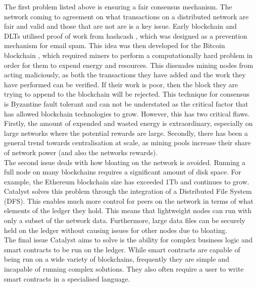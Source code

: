 The first problem listed above is ensuring a fair consensus mechanism. %
The network coming to agreement on what transactions on a distributed network are fair and valid and those that are not are is a key issue. Early blockchain and DLTs utilised proof of work from hashcash \cite{back2002hashcash}, which was designed as a prevention mechanism for email spam. This idea was then developed for the Bitcoin blockchain \cite{nakamoto2008bitcoin}, which required miners to perform a computationally hard problem in order for them to expend energy and  resources. This dissuades mining nodes from acting maliciously, as both the transactions they have added and the work they have performed can be verified. If their work is poor, then the block they are trying to append to the blockchain will be rejected. This technique for consensus is Byzantine fault tolerant and can not be understated as the critical factor that has allowed blockchain technologies to grow. However, this has two critical flaws. Firstly, the amount of expended and wasted energy is extraordinary, especially on large networks where the potential rewards are large. Secondly, there has been a general trend towards centralisation at scale, as mining pools increase their share of network power (and also the networks rewards). \\

The second issue deals with how bloating on the network is avoided. Running a full node on many blockchains requires a significant amount of disk space. For example, the Ethereum blockchain size has exceeded 1Tb \cite{EthBloat} and continues to grow. Catalyst solves this problem through the integration of a Distributed File System (DFS). This enables much more control for peers on the network in terms of what elements of the ledger they hold. This means that lightweight nodes can run with only a subset of the network data. Furthermore, large data files can be securely held on the ledger without causing issues for other nodes due to bloating. \\

The final issue Catalyst aims to solve is the ability for complex business logic and smart contracts to be run on the ledger. While smart contracts are capable of being run on a wide variety of blockchains, frequently they are simple and incapable of running complex solutions. They also often require a user to write smart contracts in a specialised language. \\